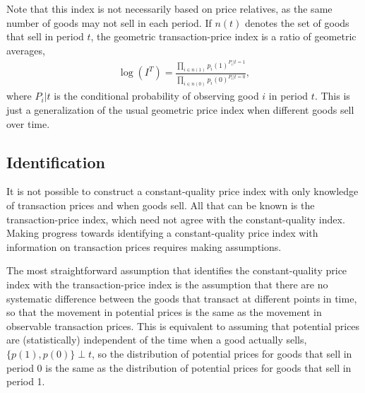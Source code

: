 \documentclass[
]{article}
\begin{document}
Note that this index is not necessarily based on price relatives, as the same number of goods may not sell in each period. If \(n(t)\) denotes the set of goods that sell in period \(t\), the geometric transaction-price index is a ratio of geometric averages,
\begin{align*}
\log(I^{T}) = \frac{\prod_{i \in n(1)} p_{i}(1)^{P_{i}|t = 1}}{\prod_{i \in n(0)} p_{i}(0)^{P_{i}|t = 0}},
\end{align*}
where \(P_{i} | t\) is the conditional probability of observing good \(i\) in period \(t\). This is just a generalization of the usual geometric price index when different goods sell over time.

\hypertarget{identification}{%
\subsection{Identification}\label{identification}}

It is not possible to construct a constant-quality price index with only knowledge of transaction prices and when goods sell. All that can be known is the transaction-price index, which need not agree with the constant-quality index. Making progress towards identifying a constant-quality price index with information on transaction prices requires making assumptions.

The most straightforward assumption that identifies the constant-quality price index with the transaction-price index is the assumption that there are no systematic difference between the goods that transact at different points in time, so that the movement in potential prices is the same as the movement in observable transaction prices. This is equivalent to assuming that potential prices are (statistically) independent of the time when a good actually sells, \(\{p(1), p(0)\} \perp t\), so the distribution of potential prices for goods that sell in period 0 is the same as the distribution of potential prices for goods that sell in period 1.
\end{document}
